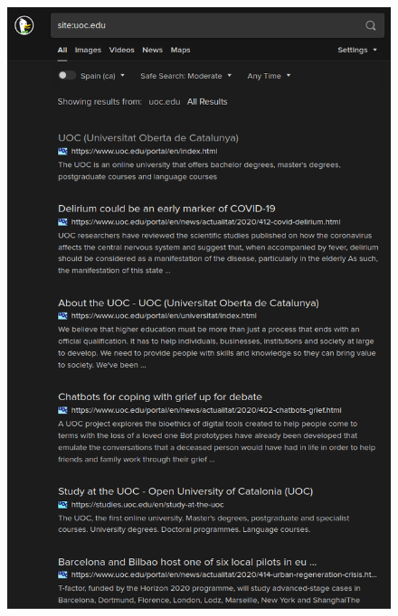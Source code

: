 \documentclass[10pt,a4paper]{article}
\begin{document}
\begin{figure}[ht!]
  \includegraphics[scale=0.27]{ddg.png}\\
  \hspace*{0.5in}

\end{figure}
\end{document}
